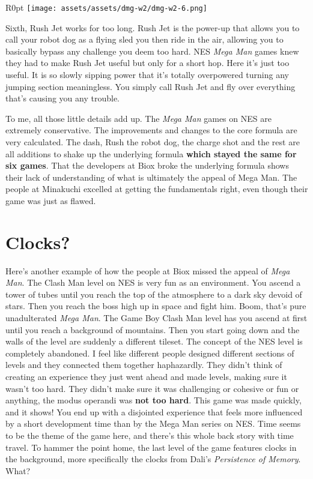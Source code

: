 \documentclass{book}
\begin{document}
\begin{wrapfigure}{R}{0pt} \texttt{[image: assets/assets/dmg-w2/dmg-w2-6.png]}\end{wrapfigure}
Sixth, Rush Jet works for too long. Rush Jet is the power-up that allows you to call your robot dog as a flying sled you then ride in the air, allowing you to basically bypass any challenge you deem too hard. NES \emph{Mega Man} games knew they had to make Rush Jet useful but only for a short hop. Here it’s just too useful. It is so slowly sipping power that it’s totally overpowered turning any jumping section meaningless. You simply call Rush Jet and fly over everything that’s causing you any trouble.

To me, all those little details add up. The \emph{Mega Man} games on NES are extremely conservative. The improvements and changes to the core formula are very calculated. The dash, Rush the robot dog, the charge shot and the rest are all additions to shake up the underlying formula \textbf{which stayed the same for six games}. That the developers at Biox broke the underlying formula shows their lack of understanding of what is ultimately the appeal of Mega Man. The people at Minakuchi excelled at getting the fundamentals right, even though their game was just as flawed.

\FloatBarrier\needspace{5pt}\section*{Clocks?}\nopagebreak[4]

Here’s another example of how the people at Biox missed the appeal of \emph{Mega Man}. The Clash Man level on NES is very fun as an environment. You ascend a tower of tubes until you reach the top of the atmosphere to a dark sky devoid of stars. Then you reach the boss high up in space and fight him. Boom, that’s pure unadulterated \emph{Mega Man}. The Game Boy Clash Man level has you ascend at first until you reach a background of mountains. Then you start going down and the walls of the level are suddenly a different tileset. The concept of the NES level is completely abandoned. I feel like different people designed different sections of levels and they connected them together haphazardly. They didn’t think of creating an experience they just went ahead and made levels, making sure it wasn’t too hard. They didn’t make sure it was challenging or cohesive or fun or anything, the modus operandi was \textbf{not too hard}. This game was made quickly, and it shows! You end up with a disjointed experience that feels more influenced by a short development time than by the Mega Man series on NES. Time seems to be the theme of the game here, and there’s this whole back story with time travel. To hammer the point home, the last level of the game features clocks in the background, more specifically the clocks from Dali’s \emph{Persistence of Memory}. What?
\end{document}
